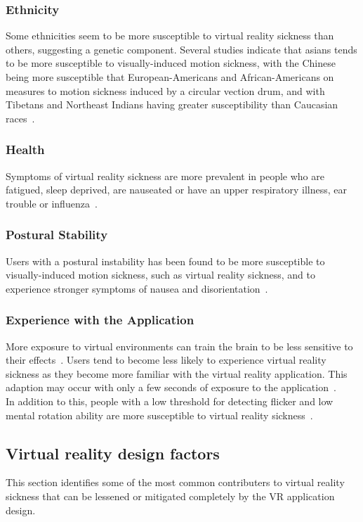 \subsubsection{Ethnicity}
Some ethnicities seem to be more susceptible to virtual reality sickness than others, suggesting a genetic component. 
Several studies indicate that asians tends to be more susceptible to visually-induced motion sickness,
with the Chinese being more susceptible that European-Americans and African-Americans on measures to motion sickness induced by a circular vection drum, and with
Tibetans and Northeast Indians having greater susceptibility than Caucasian races~\citep{Barrett2004}.

\subsubsection{Health}
Symptoms of virtual reality sickness are more prevalent in people who are fatigued, sleep deprived, are nauseated or have an upper respiratory illness, 
ear trouble or influenza~\citep{Kolasinski1995}.

\subsubsection{Postural Stability}
Users with a postural instability has been found to be more susceptible to visually-induced motion sickness, such as virtual reality sickness, and to experience
stronger symptoms of nausea and disorientation~\citep{Kolasinski1995}. 

\subsubsection{Experience with the Application}
More exposure to virtual environments can train the brain to be less sensitive to their effects~\citep{Stanney2003}. Users tend to become less likely to experience
virtual reality sickness as they become more familiar with the virtual reality application. This adaption may occur with only a few seconds of exposure to the application~\citep{Kennedy1985}.\\


In addition to this, people with a low threshold for detecting flicker and low mental rotation ability are more susceptible to virtual reality sickness~\cite{Kolasinski1995}.

\subsection{Virtual reality design factors}
This section identifies some of the most common contributers to virtual reality sickness that can be lessened or mitigated completely by the VR application design.

